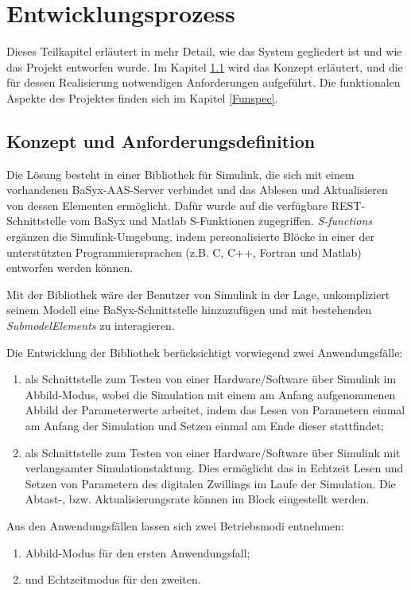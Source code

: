 \section{Entwicklungsprozess} \label{Entwicklungsprozess}

Dieses Teilkapitel erläutert in mehr Detail, wie das System gegliedert ist und wie das Projekt entworfen wurde. Im Kapitel \ref{Konzept} wird das Konzept erläutert, und die für dessen Realisierung notwendigen Anforderungen aufgeführt. Die funktionalen Aspekte des Projektes finden sich im Kapitel \ref{Funspec}. 

\subsection{Konzept und Anforderungsdefinition} \label{Konzept}

Die Lösung besteht in einer Bibliothek für Simulink, die sich mit einem vorhandenen BaSyx-AAS-Server verbindet und das Ablesen und Aktualisieren von dessen Elementen ermöglicht. Dafür wurde auf die verfügbare REST-Schnittstelle vom BaSyx und Matlab S-Funktionen zugegriffen. \textit{S-functions} ergänzen die Simulink-Umgebung, indem personalisierte Blöcke in einer der unterstützten Programmiersprachen (z.B. C, C++, Fortran und Matlab) entworfen werden können.

Mit der Bibliothek wäre der Benutzer von Simulink in der Lage, unkompliziert seinem Modell eine BaSyx-Schnittstelle hinzuzufügen und mit bestehenden \textit{SubmodelElements} zu interagieren. 

Die Entwicklung der Bibliothek berücksichtigt vorwiegend zwei Anwendungsfälle:
\begin{enumerate}
    \item als Schnittstelle zum Testen von einer Hardware/Software über Simulink im Abbild-Modus, wobei die Simulation mit einem am Anfang aufgenommenen Abbild der Parameterwerte arbeitet, indem das Lesen von Parametern einmal am Anfang der Simulation und Setzen einmal am Ende dieser stattfindet;
    \item als Schnittstelle zum Testen von einer Hardware/Software über Simulink mit verlangsamter Simulationstaktung. Dies ermöglicht das in Echtzeit Lesen und Setzen von Parametern des digitalen Zwillings im Laufe der Simulation. Die Abtast-, bzw. Aktualisierungsrate können im Block eingestellt werden.
\end{enumerate} 

Aus den Anwendungsfällen lassen sich zwei Betriebsmodi entnehmen:  
\begin{enumerate}
    \item Abbild-Modus für den ersten Anwendungsfall;
    \item und Echtzeitmodus für den zweiten. 
\end{enumerate} 

